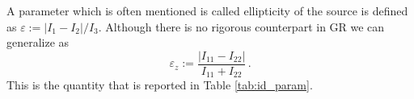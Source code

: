 \documentclass[twocolumn,superscriptaddress,showpacs,prd,aps,amsmath,amssymb,nofootinbib]{revtex4-1}
\newcommand{\be}{\begin{equation}}
\newcommand{\ee}{\end{equation}}
\begin{document}
A parameter which is often mentioned is called ellipticity of the source is defined as
$\varepsilon :=|I_1-I_2|/I_3$. Although there is no rigorous
counterpart in GR we can generalize  as 
\be
\varepsilon_z := \frac{|I_{11}-I_{22}|}{I_{11}+I_{22}} \, .
\label{eq:grell}
\ee
This is the quantity that is reported in Table \ref{tab:id_param}.



\begin{thebibliography}{200}



\end{thebibliography}
\end{document}
